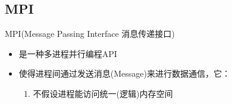
\subsection{MPI}
MPI(Message Passing Interface 消息传递接口)
\begin{itemize}
\item 是一种多进程并行编程API
\item 使得进程间通过发送消息(Message)来进行数据通信，它：

\begin{enumerate}
\item 不假设进程能访问统一(逻辑)内存空间
\end{enumerate}

\end{itemize}